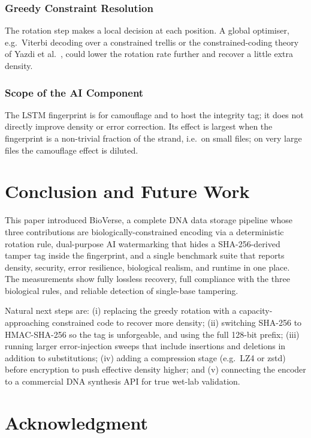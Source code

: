 \documentclass[conference]{IEEEtran}
\begin{document}
\subsubsection{Greedy Constraint Resolution}
The rotation step makes a local decision at each position. A global optimiser, e.g.\ Viterbi decoding over a constrained trellis or the constrained-coding theory of Yazdi et al.\ \cite{b5}, could lower the rotation rate further and recover a little extra density.

\subsubsection{Scope of the AI Component}
The LSTM fingerprint is for camouflage and to host the integrity tag; it does not directly improve density or error correction. Its effect is largest when the fingerprint is a non-trivial fraction of the strand, i.e.\ on small files; on very large files the camouflage effect is diluted.

\section{Conclusion and Future Work}

This paper introduced BioVerse, a complete DNA data storage pipeline whose three contributions are biologically-constrained encoding via a deterministic rotation rule, dual-purpose AI watermarking that hides a SHA-256-derived tamper tag inside the fingerprint, and a single benchmark suite that reports density, security, error resilience, biological realism, and runtime in one place. The measurements show fully lossless recovery, full compliance with the three biological rules, and reliable detection of single-base tampering.

Natural next steps are: (i) replacing the greedy rotation with a capacity-approaching constrained code to recover more density; (ii) switching SHA-256 to HMAC-SHA-256 so the tag is unforgeable, and using the full 128-bit prefix; (iii) running larger error-injection sweeps that include insertions and deletions in addition to substitutions; (iv) adding a compression stage (e.g.\ LZ4 or zstd) before encryption to push effective density higher; and (v) connecting the encoder to a commercial DNA synthesis API for true wet-lab validation.

\section*{Acknowledgment}
\end{document}
